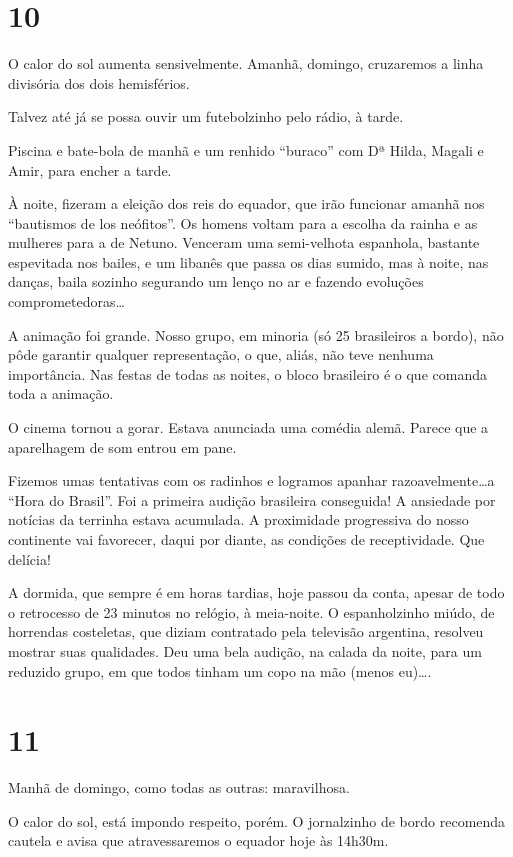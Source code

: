 \section*{10 \adfflatleafright {}}
O calor do sol aumenta sensivelmente. Amanhã, domingo, cruzaremos a linha divisória dos dois hemisférios.

Talvez até já se possa ouvir um futebolzinho pelo rádio, à tarde.

Piscina e bate-bola de manhã e um renhido ``buraco'' com Dª Hilda, Magali e Amir, para encher a tarde.

À noite, fizeram a eleição dos reis do equador, que irão funcionar amanhã nos ``bautismos de los neófitos''. Os homens voltam para a escolha da rainha e as mulheres para a de Netuno. Venceram uma semi-velhota espanhola, bastante espevitada nos bailes, e um libanês que passa os dias sumido, mas à noite, nas danças, baila sozinho segurando um lenço no ar e fazendo evoluções comprometedoras\ldots

A animação foi grande. Nosso grupo, em minoria (só 25 brasileiros a bordo), não pôde garantir qualquer representação, o que, aliás, não teve nenhuma importância. Nas festas de todas as noites, o bloco brasileiro é o que comanda toda a animação.

O cinema tornou a gorar. Estava anunciada uma comédia alemã. Parece que a aparelhagem de som entrou em pane.

Fizemos umas tentativas com os radinhos e logramos apanhar razoavelmente\ldots a ``Hora do Brasil''. Foi a primeira audição brasileira conseguida! A ansiedade por notícias da terrinha estava acumulada. A proximidade progressiva do nosso continente vai favorecer, daqui por diante, as condições de receptividade. Que delícia!

A dormida, que sempre é em horas tardias, hoje passou da conta, apesar de todo o retrocesso de 23 minutos no relógio, à meia-noite. O espanholzinho miúdo, de horrendas costeletas, que diziam contratado pela televisão argentina, resolveu mostrar suas qualidades. Deu uma bela audição, na calada da noite, para um reduzido grupo, em que todos tinham um copo na mão (menos eu)\ldots.

\section*{11 \adfflatleafright {}}
Manhã de domingo, como todas as outras: maravilhosa.

O calor do sol, está impondo respeito, porém. O jornalzinho de bordo recomenda cautela e avisa que atravessaremos o equador hoje às 14h30m.

